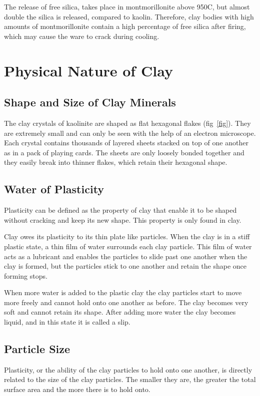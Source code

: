 The release of free silica, takes place in montmorillonite above 950\degree C, 
but almost double the silica is released, compared to kaolin. Therefore, clay 
bodies with high amounts of montmorillonite contain a high percentage of free 
silica after firing, which may cause the ware to crack during cooling.
\section{Physical Nature of Clay}
\subsection{Shape and Size of Clay Minerals}
The clay crystals of kaolinite are shaped as flat hexagonal flakes 
(fig~\ref{fig}). They are extremely small and can only be seen with the help of 
an electron microscope. Each crystal contains thousands of layered sheets 
stacked on top of one another as in a pack of playing cards. The sheets are 
only loosely bonded together and they easily break into thinner flakes, which 
retain their hexagonal shape.
\subsection{Water of Plasticity}
Plasticity can be defined as the property of clay that enable it to be shaped 
without cracking and keep its new shape. This property is only found in clay.

Clay owes its plasticity to its thin plate like particles. When the clay is in 
a stiff plastic state, a thin film of water surrounds each clay particle. This 
film of water acts as a lubricant and enables the particles to slide past one 
another when the clay is formed, but the particles stick to one another and 
retain the shape once forming stops.

When more water is added to the plastic clay the clay particles start to move 
more freely and cannot hold onto one another as before. The clay becomes very 
soft and cannot retain its shape. After adding more water the clay becomes 
liquid, and in this state it is called a slip.
\subsection{Particle Size}
Plasticity, or the ability of the clay particles to hold onto one another, is 
directly related to the size of the clay particles. The smaller they are, the 
greater the total surface area and the more there is to hold onto.

